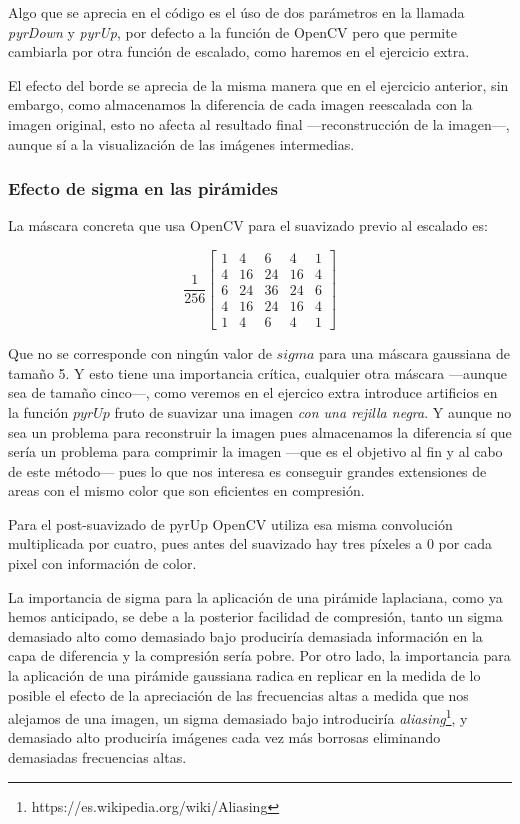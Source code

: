 \documentclass{article}
\newcommand{\img}[2]{
\noindent\makebox[\textwidth][c]{\texttt{[image: \#1]}}%
}
\begin{document}
Algo que se aprecia en el código es el úso de dos parámetros en la llamada \textit{pyrDown} y \textit{pyrUp}, por defecto a la función de OpenCV pero que permite cambiarla por otra función de escalado, como haremos en el ejercicio extra.

El efecto del borde se aprecia de la misma manera que en el ejercicio anterior, sin embargo, como almacenamos la diferencia de cada imagen reescalada con la imagen original, esto no afecta al resultado final ---reconstrucción de la imagen---, aunque sí a la visualización de las imágenes intermedias.

\img{eximg/ej8_c}{0.8}

\img{eximg/ej8_r}{0.8}

\subsubsection{Efecto de sigma en las pirámides}

La máscara concreta que usa OpenCV para el suavizado previo al escalado es:

\[\frac{1}{256} \begin{bmatrix} 1 & 4 & 6 & 4 & 1 \\ 4 & 16 & 24 & 16 & 4 \\ 6 & 24 & 36 & 24 & 6 \\ 4 & 16 & 24 & 16 & 4 \\ 1 & 4 & 6 & 4 & 1 \end{bmatrix}\]

Que no se corresponde con ningún valor de $sigma$ para una máscara gaussiana de tamaño 5. Y esto tiene una importancia crítica, cualquier otra máscara ---aunque sea de tamaño cinco---, como veremos en el ejercico extra introduce artificios en la función $pyrUp$ fruto de suavizar una imagen \textit{con una rejilla negra}. Y aunque no sea un problema para reconstruir la imagen pues almacenamos la diferencia sí que sería un problema para comprimir la imagen ---que es el objetivo al fin y al cabo de este método--- pues lo que nos interesa es conseguir grandes extensiones de areas con el mismo color que son eficientes en compresión.

Para el post-suavizado de pyrUp OpenCV utiliza esa misma convolución multiplicada por cuatro, pues antes del suavizado hay tres píxeles a 0 por cada pixel con información de color.

La importancia de sigma para la aplicación de una pirámide laplaciana, como ya hemos anticipado, se debe a la posterior facilidad de compresión, tanto un sigma demasiado alto como demasiado bajo produciría demasiada información en la capa de diferencia y la compresión sería pobre. Por otro lado, la importancia para la aplicación de una pirámide gaussiana radica en replicar en la medida de lo posible el efecto de la apreciación de las frecuencias altas a medida que nos alejamos de una imagen, un sigma demasiado bajo introduciría \textit{aliasing}\footnote{https://es.wikipedia.org/wiki/Aliasing}, y demasiado alto produciría imágenes cada vez más borrosas eliminando demasiadas frecuencias altas.
\end{document}
